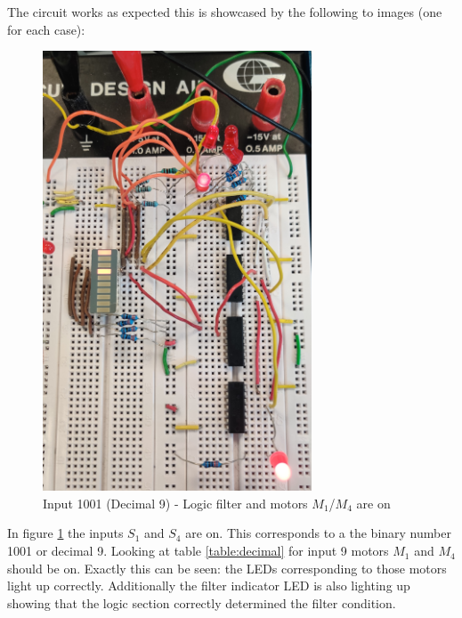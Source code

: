 \documentclass[14pt]{article}
\begin{document}
The circuit works as expected this is showcased by the following to images (one for each case):

\begin{figure}[H]
  \centering
  \includegraphics[width=8cm]{./images/logic_fitler_on.jpg}
  \caption{Input 1001 (Decimal 9) - Logic filter and motors $M_1$/$M_4$ are on }
  \label{fig:circuit_filter_on}
\end{figure}

In figure \ref{fig:circuit_filter_on} the inputs $S_1$ and $S_4$ are on. This corresponds to a the binary number 1001 or decimal 9. Looking
at table \ref{table:decimal} for input 9 motors $M_1$ and $M_4$ should be on. Exactly this can be seen: the LEDs corresponding to those
motors light up correctly. Additionally the filter indicator LED is also lighting up showing that the logic section correctly determined
the filter condition.
\end{document}
